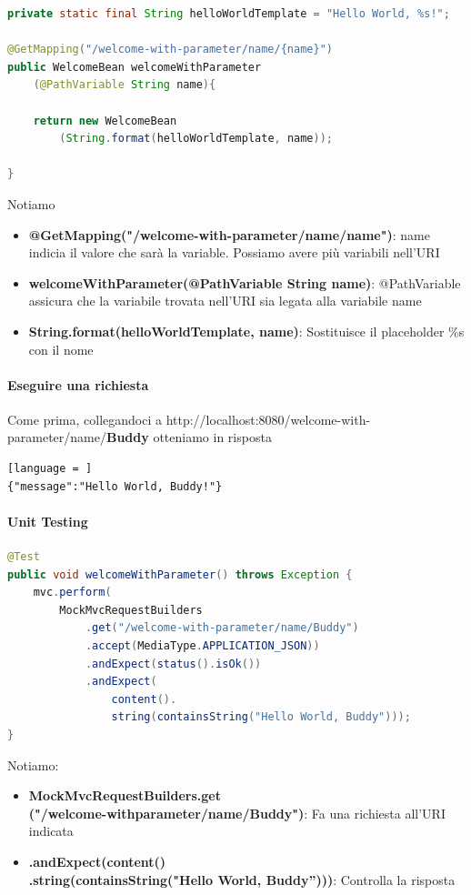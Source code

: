 \documentclass[11pt,a4paper]{book}
\begin{document}
\begin{lstlisting}[language = Java]
private static final String helloWorldTemplate = "Hello World, %s!";
	
@GetMapping("/welcome-with-parameter/name/{name}")
public WelcomeBean welcomeWithParameter
	(@PathVariable String name){
	
	return new WelcomeBean
		(String.format(helloWorldTemplate, name));
		
}
\end{lstlisting}
Notiamo
\begin{itemize}
	\item \textbf{@GetMapping("/welcome-with-parameter/name/{name}")}: {name} indicia il valore che sarà la variable. Possiamo avere più variabili nell'URI
	\item \textbf{welcomeWithParameter(@PathVariable String name)}: @PathVariable assicura che la variabile trovata nell'URI sia legata alla variabile name
	\item \textbf{String.format(helloWorldTemplate, name)}: Sostituisce il placeholder \%s con il nome
\end{itemize}

\paragraph{Eseguire una richiesta}
Come prima, collegandoci a http://localhost:8080/welcome-with-parameter/name/\textbf{Buddy} otteniamo in risposta
\begin{lstlisting}[language = ]
{"message":"Hello World, Buddy!"}
\end{lstlisting}

\paragraph{Unit Testing}
\begin{lstlisting}[language = Java]
@Test
public void welcomeWithParameter() throws Exception {
	mvc.perform(
		MockMvcRequestBuilders
			.get("/welcome-with-parameter/name/Buddy")
			.accept(MediaType.APPLICATION_JSON))
			.andExpect(status().isOk())
			.andExpect(
				content().
				string(containsString("Hello World, Buddy")));
}
\end{lstlisting}

Notiamo:
\begin{itemize}
	\item \textbf{MockMvcRequestBuilders.get\\
		("/welcome-withparameter/name/Buddy")}: Fa una richiesta all'URI indicata
	\item \textbf{.andExpect(content()\\
		.string(containsString("Hello World, Buddy”)))}: Controlla la risposta
\end{itemize}
\end{document}
